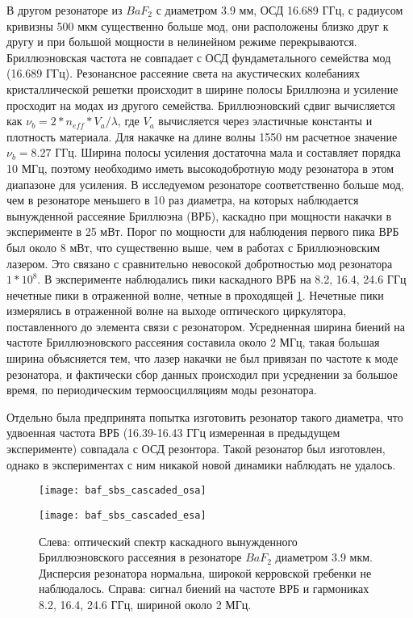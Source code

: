 В другом резонаторе из $BaF_2$ с диаметром 3.9 мм, ОСД 16.689 ГГц, с радиусом кривизны 500 мкм существенно больше мод, они расположены близко друг к другу и при большой мощности в нелинейном режиме перекрываются. Бриллюэновская частота не совпадает с ОСД фундаметального семейства мод (16.689 ГГц). Резонансное рассеяние света на акустических колебаниях кристаллической решетки происходит в ширине полосы Бриллюэна и усиление просходит на модах из другого семейства. Бриллюэновский сдвиг вычисляется как $\nu_b=2*n_{eff}*V_a/\lambda$, где $V_a$ вычисляется через эластичные константы и плотность материала. Для накачке на длине волны 1550 нм расчетное значение $\nu_b=8.27$ ГГц. Ширина полосы усиления достаточна мала и составляет порядка 10 МГц, поэтому необходимо иметь высокодобротную моду резонатора в этом диапазоне для усиления. В исследуемом резонаторе соответственно больше мод, чем в резонаторе меньшего в 10 раз диаметра, на которых наблюдается вынужденной рассеяние Бриллюэна (ВРБ), каскадно при мощности накачки в эксперименте в 25 мВт. Порог по мощности для наблюдения первого пика ВРБ был около 8 мВт, что существенно выше, чем в работах с Бриллюэновским лазером. Это связано с сравнительно невосокой добротностью мод резонатора $1*10^8$. В эксперименте наблюдались пики каскадного ВРБ на 8.2, 16.4, 24.6 ГГц нечетные пики в отраженной волне, четные в проходящей \ref{baf_sbs}. Нечетные пики измерялись в отраженной волне на выходе оптического циркулятора, поставленного до элемента связи с резонатором. Усредненная ширина биений на частоте Бриллюэновского рассеяния составила около 2 МГц, такая большая ширина объясняется тем, что лазер накачки не был привязан по частоте к моде резонатора, и фактически сбор данных происходил при усреднении за большое время, по периодическим термоосцилляциям моды резонатора.

Отдельно была предпринята попытка изготовить резонатор такого диаметра, что удвоенная частота ВРБ (16.39-16.43 ГГц измеренная в предыдущем эксперименте) совпадала с ОСД резонтора. Такой резонатор был изготовлен, однако в экспериментах с ним никакой новой динамики наблюдать не удалось.

\begin{figure}[ht]
\begin{minipage}[ht]{0.49\linewidth}\centering
    \texttt{[image: baf\_sbs\_cascaded\_osa]}
  \end{minipage}
  \hfill
  \begin{minipage}[ht]{0.49\linewidth}\centering
    \texttt{[image: baf\_sbs\_cascaded\_esa]}
  \end{minipage}
    \caption{Слева: оптический спектр каскадного вынужденного Бриллюэновского рассеяния в резонаторе $BaF_2$ диаметром 3.9 мкм. Дисперсия резонатора нормальна, широкой керровской гребенки не наблюдалось. Справа: сигнал биений на частоте ВРБ и гармониках 8.2, 16.4, 24.6 ГГц, шириной около 2 МГц.}
  \label{baf_sbs}
\end{figure}

